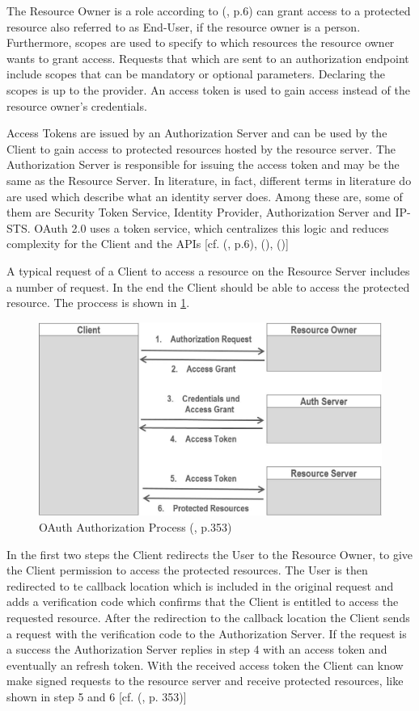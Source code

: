{The Resource Owner is a role according to (\cite{Sakimura:2014:OpenIDConnect}, p.6) can grant access to a protected resource also referred to as End-User, if the resource owner is a person. Furthermore, scopes are used to specify to which resources the resource owner wants to grant access. Requests that which are sent to an authorization endpoint include scopes that can be mandatory or optional parameters. Declaring the scopes is up to the provider. An access token is used to gain access instead of the resource owner’s credentials. 

Access Tokens are issued by an Authorization Server and can be used by the Client to gain access to protected resources hosted by the resource server. The Authorization Server is responsible for issuing the access token and may be the same as the Resource Server. In literature, in fact,  different terms in literature do are used which describe what an identity server does. Among these are, some of them are Security Token Service, Identity Provider, Authorization Server and IP-STS. OAuth 2.0 uses a token service, which centralizes this logic and reduces complexity for the Client and the APIs [cf. (\cite{Sakimura:2014:OpenIDConnect}, p.6), (\cite{Brock:2018:ID4}), (\cite{Boyd:2012:GSOAuth})]

A typical request of a Client to access a resource on the Resource Server includes a number of request. In the end the Client should be able to access the protected resource. The proccess is shown in \ref{fig:oaut-process2}.

\begin{figure}[h]
	\centering
	\includegraphics[width=0.8\linewidth]{images/oaut-process2}
	\caption{OAuth Authorization Process (\cite{LeBlanc:2011:SocialApplications}, p.353)}
	\label{fig:oaut-process2}
\end{figure}

In the first two steps the Client redirects the User to the Resource Owner, to give the Client permission to access the protected resources. The User is then redirected to te callback location which is included in the original request and adds a verification code which confirms that the Client is entitled to access the requested resource. After the redirection to the callback location the Client sends a request with the verification code to the Authorization Server. If the request is a success the Authorization Server replies in step 4 with an access token and eventually an refresh token. With the received access token the Client can know make signed requests to the resource server and receive protected resources, like shown in step 5 and 6 [cf. (\cite{LeBlanc:2011:SocialApplications}, p. 353)]


}
